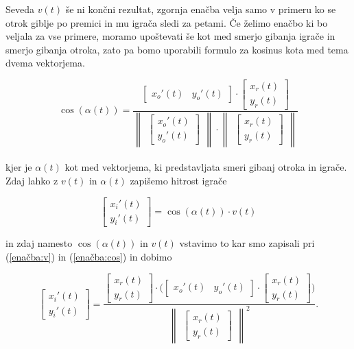 \documentclass[mat1,reqno]{fmfdelo}
\begin{document}
Seveda $v(t)$ še ni končni rezultat, zgornja enačba velja samo v primeru ko se otrok giblje po premici in mu igrača sledi za petami. Če želimo enačbo ki bo veljala za vse primere, moramo upoštevati še kot med smerjo gibanja igrače in smerjo gibanja otroka, zato pa bomo uporabili formulo za kosinus kota med tema dvema vektorjema.

\begin{equation}\label{enačba:cos}
\cos(\alpha(t)) = \frac{
\begin{bmatrix}
	x_{o}'(t) & y_{o}'(t)
\end{bmatrix}
\cdot
\begin{bmatrix}
	x_{r}(t) \\
	y_{r}(t)
\end{bmatrix}
}{
\begin{Vmatrix}
\begin{bmatrix}
	x_{o}'(t) \\
	y_{o}'(t)
\end{bmatrix}
\end{Vmatrix}
\cdot
\begin{Vmatrix}
\begin{bmatrix}
	x_{r}(t) \\
	y_{r}(t)
\end{bmatrix}
\end{Vmatrix}
}
\end{equation}
\\
kjer je $\alpha(t)$ kot med vektorjema, ki predstavljata smeri gibanj otroka in igrače. Zdaj lahko z $v(t)$ in $\alpha(t)$ zapišemo hitrost igrače

\begin{equation*}
\begin{bmatrix}
	x_{i}'(t) \\
	y_{i}'(t)
\end{bmatrix} = \cos(\alpha(t)) \cdot v(t)
\end{equation*}

in zdaj namesto $\cos(\alpha(t))$ in $v(t)$ vstavimo to kar smo zapisali pri (\ref{enačba:v}) in (\ref{enačba:cos}) in dobimo

\begin{equation*}
\begin{bmatrix}
	x_{i}'(t) \\
	y_{i}'(t)
\end{bmatrix} = \frac{
\begin{bmatrix}
	x_{r}(t) \\
	y_{r}(t)
\end{bmatrix}
\cdot
\Big(
\begin{bmatrix}
	x_{o}'(t) & y_{o}'(t)
\end{bmatrix}
\cdot
\begin{bmatrix}
	x_{r}(t) \\
	y_{r}(t)
\end{bmatrix}
\Big)
}{
\begin{Vmatrix}
\begin{bmatrix}
	x_{r}(t) \\
	y_{r}(t)
\end{bmatrix}
\end{Vmatrix}^2
}.
\end{equation*}
\\
\end{document}
